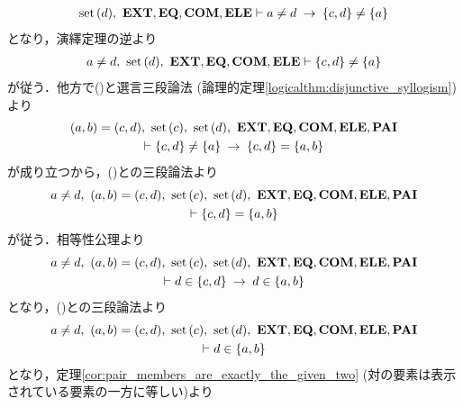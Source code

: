 \begin{sketch}
\begin{description}
				\begin{align}
					\operatorname*{set}\hspace{0.15em}(d),\ \mbox{{\bf EXT}},\mbox{{\bf EQ}},\mbox{\bf COM},\mbox{{\bf ELE}} \vdash a \neq d \hspace{0.25em}\rightarrow\hspace{0.25em} \{c,d\} \neq \{a\}
				\end{align}
				となり，演繹定理の逆より
				\begin{align}
					a \neq d,\ \operatorname*{set}\hspace{0.15em}(d),\ \mbox{{\bf EXT}},\mbox{{\bf EQ}},\mbox{\bf COM},\mbox{{\bf ELE}} \vdash \{c,d\} \neq \{a\}
					\label{fom:equality_of_ordered_pairs_16}
				\end{align}
				が従う．他方で()と選言三段論法
				(論理的定理\ref{logicalthm:disjunctive_syllogism})より
				\begin{align}
					\begin{gathered}
						(a,b) = (c,d),\ \set{c},\ \set{d},\ \EXTAX,\EQAX,\COMAX,\ELEAX,\PAIAX \\
						\vdash \{c,d\} \neq \{a\} \rarrow \{c,d\} = \{a,b\}
					\end{gathered}
				\end{align}
				が成り立つから，()との三段論法より
				\begin{align}
					\begin{gathered}
						a \neq d,\ (a,b) = (c,d),\ \set{c},\ \set{d},\ \EXTAX,\EQAX,\COMAX,\ELEAX,\PAIAX \\
						\vdash \{c,d\} = \{a,b\}
					\end{gathered} 
				\end{align}
				が従う．相等性公理より
				\begin{align}
					\begin{gathered}
						a \neq d,\ (a,b) = (c,d),\ \set{c},\ \set{d},\ \EXTAX,\EQAX,\COMAX,\ELEAX,\PAIAX \\
						\vdash d \in \{c,d\} \rarrow d \in \{a,b\}
					\end{gathered}
				\end{align}
				となり，()との三段論法より
				\begin{align}
					\begin{gathered}
						a \neq d,\ (a,b) = (c,d),\ \set{c},\ \set{d},\ \EXTAX,\EQAX,\COMAX,\ELEAX,\PAIAX \\
						\vdash d \in \{a,b\}
					\end{gathered}
				\end{align}
				となり，定理\ref{cor:pair_members_are_exactly_the_given_two} (対の要素は表示されている要素の一方に等しい)より
				\begin{align}
					\begin{gathered}

\end{gathered}
\end{align}
\end{description}
\end{sketch}
